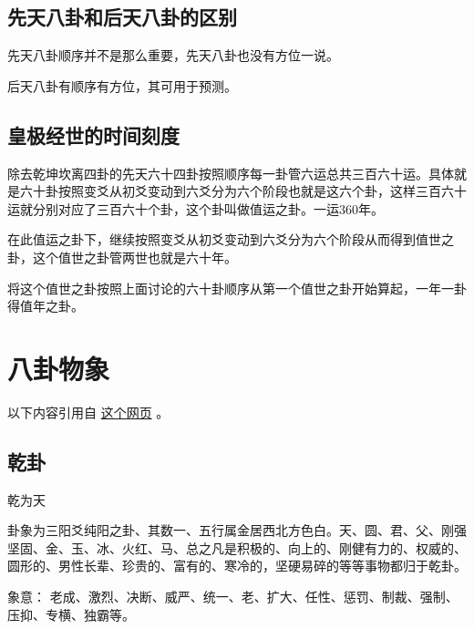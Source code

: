\documentclass[12pt,oneside]{book}
\begin{document}
\section{先天八卦和后天八卦的区别}
先天八卦顺序并不是那么重要，先天八卦也没有方位一说。

后天八卦有顺序有方位，其可用于预测。


\section{皇极经世的时间刻度}
除去乾坤坎离四卦的先天六十四卦按照顺序每一卦管六运总共三百六十运。具体就是六十卦按照变爻从初爻变动到六爻分为六个阶段也就是这六个卦，这样三百六十运就分别对应了三百六十个卦，这个卦叫做值运之卦。一运360年。

在此值运之卦下，继续按照变爻从初爻变动到六爻分为六个阶段从而得到值世之卦，这个值世之卦管两世也就是六十年。

将这个值世之卦按照上面讨论的六十卦顺序从第一个值世之卦开始算起，一年一卦得值年之卦。

\chapter{八卦物象}
以下内容引用自 \href{https://www.douban.com/note/684840565/}{这个网页} 。

\section{乾卦}
乾为天

卦象为三阳爻纯阳之卦、其数一、五行属金居西北方色白。天、圆、君、父、刚强坚固、金、玉、冰、火红、马、总之凡是积极的、向上的、刚健有力的、权威的、圆形的、男性长辈、珍贵的、富有的、寒冷的，坚硬易碎的等等事物都归于乾卦。

象意： 老成、激烈、决断、威严、统一、老、扩大、任性、惩罚、制裁、强制、压抑、专横、独霸等。
\end{document}
